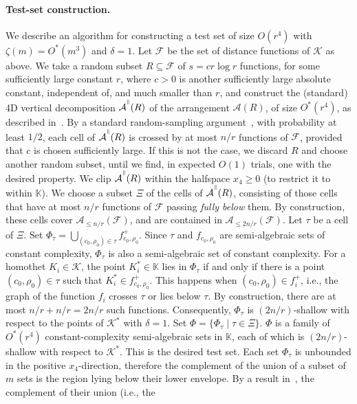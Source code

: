\documentclass[11pt]{article}
\def\Kspace{{\mathbb K}}
\def\A{\mathcal{A}}
\def\F{\mathcal{F}}
\def\K{\mathcal{K}}
\def\cell{\tau}
\def\VeD#1{{#1}^{\mbox{\raisebox{4pt}{\tiny$\|$}}}}
\def\Ak#1{\A_{{\le}#1}}
\theoremstyle{definition}
\begin{document}
\paragraph{Test-set construction.}
\fi
We describe an algorithm for constructing a test set 
of size $O(r^4)$ with $\zeta(m)=O^*(m^3)$ and $\delta=1$.
Let $\F$ be the set of distance functions of $\K$ as above. We take a 
random subset $R\subseteq \F$ of $s = cr\log r$ functions, for some sufficiently large constant $r$, 
where $c>0$ is another sufficiently large absolute constant, independent of, and much smaller than $r$, 
and construct the (standard) 4D
vertical decomposition $\VeD{\A}(R)$ of the arrangement $\A(R)$, of size $O^*(r^4)$, as 
described in~\cite{AES,Koltun-04a,SA}.
By a standard random-sampling argument~\cite{HW87}, with probability at least $1/2$, 
each cell of $\VeD{\A}(R)$ is crossed by at most $n/r$ functions of $\F$, 
provided that $c$ is chosen sufficiently large.
If this is not the case, we discard $R$ and choose another random subset, until we find, in
expected $O(1)$ trials, one with
the desired property. 
We clip $\VeD{\A}(R)$ within the halfspace $x_4\ge 0$ (to restrict it to within $\Kspace$).
We choose a subset $\Xi$ of the cells of $\VeD{\A}(R)$, consisting of those cells that have at most 
$n/r$ functions of $\F$ passing \emph{fully below} them. By construction, these cells cover 
$\Ak{n/r}(\F)$, and are contained in $\Ak{2n/r}(\F)$.
%
Let $\cell$ be a cell of $\Xi$.
Set $\Phi_\cell = \bigcup_{(c_0,\rho_0)\in\cell} f_{c_0,\rho_0}^+$.
Since $\cell$ and $f_{c_0,\rho_0}$ are semi-algebraic sets of constant complexity, 
$\Phi_\cell$ is also a semi-algebraic set of constant complexity. 
For a homothet $K_i\in \K$, the point $K_i^* \in \Kspace$ lies in $\Phi_\cell$ if and only 
if there is a point $(c_0,\rho_0)\in\cell$ such that $K_i^* \in f_{c_0,\rho_0}^+$. This happens
when $(c_0,\rho_0)\in f_i^+$, i.e., the graph of 
the function $f_i$ crosses $\cell$ or lies below $\cell$.
By construction, there are at most $n/r + n/r = 2n/r$ such functions. 
Consequently, $\Phi_\cell$ is $(2n/r)$-shallow with respect to the points of $\K^*$ with
$\delta = 1$.
%
Set $\Phi = \{\Phi_\cell \mid \cell \in \Xi\}$.
$\Phi$ is a family of $O^*(r^4)$ constant-complexity semi-algebraic 
sets
in $\Kspace$, each of which is $(2n/r)$-shallow with respect to $\K^*$. This is the desired test set.
Each set $\Phi_\cell$ is unbounded in the positive $x_4$-direction, therefore the 
complement of the union of a subset of $m$ sets is the region lying below their 
lower envelope. By a result in~\cite{AES:vd}, the complement of their union (i.e., the 
\end{document}
